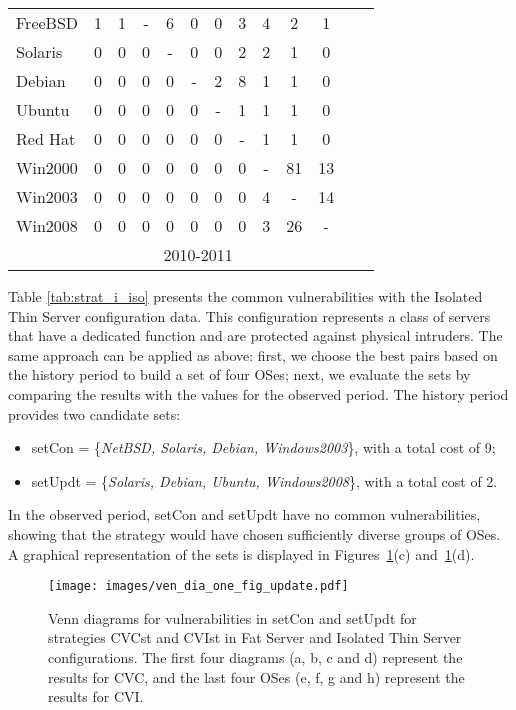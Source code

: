 \begin{table}[!ht]
\begin{center}
{\begin{tabular}{|l|c|c|c|c|c|c|c|c|c|c|c|c|}
FreeBSD & 1 & 1 & - & 6 & 0 & 0 & 3 & 4 & 2 & 1& \\ \cline{1-11}
Solaris & 0 & 0 & 0 & - & 0 & 0 & 2 & 2 & 1 & 0& \\ \cline{1-11}
Debian & 0 & 0 & 0 & 0 & - & 2 & 8 & 1 & 1 & 0 &\\ \cline{1-11}
Ubuntu & 0 & 0 & 0 & 0 & 0 & - & 1 & 1 & 1 & 0 &\\ \cline{1-11}
Red Hat & 0 & 0 & 0 & 0 & 0 & 0 & - & 1 & 1 & 0 &\\ \cline{1-11}
Win2000 & 0 & 0 & 0 & 0 & 0 & 0 & 0 & - & 81 & 13 &\\ \cline{1-11}
Win2003 & 0 & 0 & 0 & 0 & 0 & 0 & 0 & 4 & - & 14 &\\ \cline{1-12}
Win2008 & 0 & 0 & 0 & 0 & 0 & 0 & 0 & 3 & 26 & - & \multicolumn{1}{|c}{}  \\ \cline{1-11}
 \multicolumn{1}{c|}{}& \multicolumn{9}{|c|}{2010-2011} & \multicolumn{2}{|c}{}\\ \cline{2-10}
\end{tabular}
}
\end{center}
\end{table}





Table \ref{tab:strat_i_iso} presents the common vulnerabilities with the Isolated Thin Server configuration data. This configuration represents a class of servers that have a dedicated function and are protected against physical intruders. The same approach can be applied as above: first, we choose the best pairs based on the history period to build a set of four OSes; next, we evaluate the sets by comparing the results with the values for the observed period. The history period provides two candidate sets: 

\begin{itemize}
\item setCon = \{\emph{NetBSD, Solaris, Debian, Windows2003}\}, with a total cost of 9;
\item setUpdt = \{\emph{Solaris, Debian, Ubuntu, Windows2008}\}, with a total cost of 2.
\end{itemize}

In the observed period, setCon and setUpdt have no common vulnerabilities, showing that the strategy would have chosen sufficiently diverse groups of OSes. A graphical representation of the sets is displayed in Figures~\ref{fig-venn}(c) and~\ref{fig-venn}(d).

\begin{figure}[!ht]
 \centering
 \texttt{[image: images/ven\_dia\_one\_fig\_update.pdf]}
 \caption{Venn diagrams for vulnerabilities in setCon and setUpdt for strategies CVCst and CVIst in Fat Server and Isolated Thin Server configurations. The first four diagrams (a, b, c and d) represent the results for CVC, and the last four OSes (e, f, g and h) represent the results for CVI.}
 \label{fig-venn}
\end{figure}


